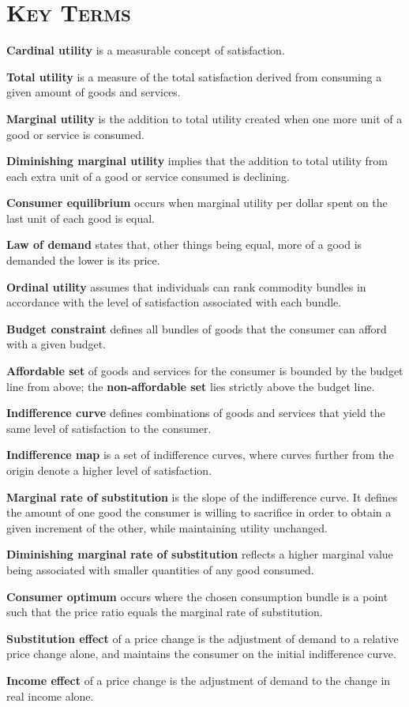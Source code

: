 \newpage
{}
	\section*{\textsc{Key Terms}}
\begin{keyterms}
\textbf{Cardinal utility} is a measurable concept of satisfaction.

\textbf{Total utility} is a measure of the total satisfaction derived from consuming a given amount of goods and services.

\textbf{Marginal utility} is the addition to total utility created when one more unit of a good or service is consumed.

\textbf{Diminishing marginal utility} implies that the addition to total utility from each extra unit of a good or service consumed is declining.

\textbf{Consumer equilibrium} occurs when marginal utility per dollar spent on the last unit of each good is equal.

\textbf{Law of demand} states that, other things being equal, more of a good is demanded the lower is its price.

\textbf{Ordinal utility} assumes that individuals can rank commodity bundles in accordance with the level of satisfaction associated with each bundle.

\textbf{Budget constraint} defines all bundles of goods that the consumer can afford with a given budget.

\textbf{Affordable set} of goods and services for the consumer is bounded by the budget line from above; the \textbf{non-affordable set} lies strictly above the budget line.

\textbf{Indifference curve} defines combinations of goods and services that yield the same level of satisfaction to the consumer.

\textbf{Indifference map} is a set of indifference curves, where curves further from the origin denote a higher level of satisfaction.

\textbf{Marginal rate of substitution} is the slope of the indifference curve. It defines the amount of one good the consumer is willing to sacrifice in order to obtain a given increment of the other, while maintaining utility unchanged.

\textbf{Diminishing marginal rate of substitution} reflects a higher marginal value being associated with smaller quantities of any good consumed.

\textbf{Consumer optimum} occurs where the chosen consumption bundle is a point such that the price ratio equals the marginal rate of substitution.

\textbf{Substitution effect} of a price change is the adjustment of demand to a relative price change alone, and maintains the consumer on the initial indifference curve.

\textbf{Income effect} of a price change is the adjustment of demand to the change in real income alone.
\end{keyterms}
